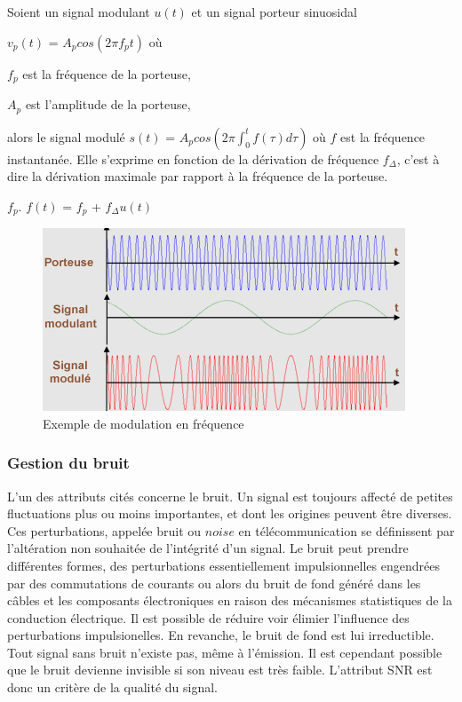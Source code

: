 \vspace{0.1cm}

Soient un signal modulant $u(t)$ et un signal porteur sinuosidal

\vspace{0.1cm}

$v_{p}(t)$ = $A_{p}cos(2\pi f_{p}t)$ où

$f_{p}$ est la fréquence de la porteuse,

$A_{p}$ est l'amplitude de la porteuse,

alors le signal modulé $s(t)$ = $A_{p}cos(2\pi \int_{0}^{t}f(\tau)d\tau)$ où $f$ est la fréquence instantanée. Elle s'exprime en fonction de la dérivation de fréquence $f_{\Delta}$, c'est à dire la dérivation maximale par rapport à la fréquence de la porteuse.

\newpage

$f_{p}$. $f(t)$ = $f_{p}$ + $f_{\Delta} u(t)$

\begin{figure}[h]
\centering

\includegraphics[scale=1]{images/FM_mod.PNG}
\caption{Exemple de modulation en fréquence}\label{term2}
\end{figure}



\subsubsection{Gestion du bruit}



L'un des attributs cités concerne le bruit. Un signal est toujours affecté de petites fluctuations plus ou moins importantes, et dont les origines peuvent être diverses. Ces perturbations, appelée bruit ou $noise$ en télécommunication se définissent par l'altération non souhaitée de l'intégrité d'un signal. Le bruit peut prendre différentes formes, des perturbations essentiellement impulsionnelles engendrées par des commutations de courants ou alors du bruit de fond généré dans les câbles et les composants électroniques en raison
des mécanismes statistiques de la conduction électrique. Il est possible de réduire voir élimier l'influence des perturbations impulsionelles. En revanche, le bruit de fond est lui irreductible. Tout signal sans bruit n'existe pas, même à l'émission. Il est cependant possible que le bruit devienne invisible si son niveau est très faible. L'attribut SNR est donc un critère de la qualité du signal.

